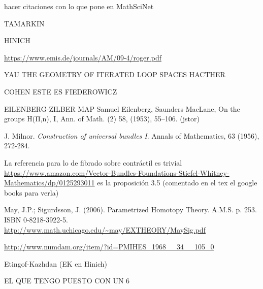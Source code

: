 \documentclass[TFM.tex]{subfiles}
\begin{document}
%


\begin{thebibliography}{}






 hacer citaciones con lo que pone en MathSciNet

 TAMARKIN

 HINICH

 \url{https://www.emis.de/journals/AM/09-4/roger.pdf}





 YAU
 THE GEOMETRY OF ITERATED LOOP SPACES
 HACTHER

 COHEN
 ESTE ES FIEDEROWICZ

 EILENBERG-ZILBER MAP Samuel Eilenberg, Saunders MacLane, On the groups H(Π,n), I, Ann. of Math. (2) 58, (1953), 55–106. (jstor)


 J. Milnor. \emph{Construction of universal bundles I}. Annals of Mathematics, 63 (1956), 272-284. 

 La referencia para lo de fibrado sobre contráctil es trivial \url{https://www.amazon.com/Vector-Bundles-Foundations-Stiefel-Whitney-Mathematics/dp/0125293011} es la proposición 3.5 (comentado en el tex el google books para verla) %

 May, J.P.; Sigurdsson, J. (2006). Parametrized Homotopy Theory. A.M.S. p. 253. ISBN 0-8218-3922-5. \url{http://www.math.uchicago.edu/~may/EXTHEORY/MaySig.pdf}

 \url{http://www.numdam.org/item/?id=PMIHES_1968__34__105_0}




  Etingof-Kazhdan (EK en Hinich)



 EL QUE TENGO PUESTO CON UN 6
\end{thebibliography}
\end{document}
